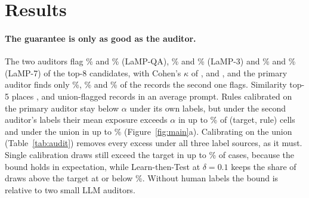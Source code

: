 \section{Results}
\label{sec:results}

\paragraph{The guarantee is only as good as the auditor.}
The two auditors flag \qaRateDisc\% and \qaRateGemma\% (LaMP-QA),
\threeRateDisc\% and \threeRateGemma\% (LaMP-3) and \sevenRateDisc\% and
\sevenRateGemma\% (LaMP-7) of the top-8 candidates, with Cohen's $\kappa$ of
\qaKappaFull{}, \threeKappaFull{} and \sevenKappaFull{}, and the primary
auditor finds only \qaQwenRecGemma\%, \threeQwenRecGemma\% and
\sevenQwenRecGemma\% of the records the second one flags. Similarity top-5
places \qaESimK{}, \threeESimK{} and \sevenESimK{} union-flagged records in an
average prompt. Rules calibrated on the primary auditor stay below $\alpha$ under its own
labels, but under the second auditor's labels their mean exposure exceeds
$\alpha$ in up to \qaCalQwenMeasGemma\% of (target, rule) cells and under the
union in up to \qaCalQwenMeasUnion\% (Figure~\ref{fig:main}a). Calibrating on
the union (Table~\ref{tab:audit}) removes every excess under all three label
sources, as it must. Single calibration draws still exceed the
target in up to \CrcAboveMax\% of cases, because the bound holds in
expectation, while Learn-then-Test at $\delta=0.1$ keeps the share of draws
above the target at or below \LttAboveMax\%. Without human labels the bound
is relative to two small LLM auditors.

\begin{table}[t]
\caption{Share of the 24 (target, rule) cells whose mean test exposure
exceeds $\alpha$, with the largest excess in records, by calibration labels
and measurement labels.}
\label{tab:audit}
\small
\setlength{\tabcolsep}{3pt}

\end{table}

